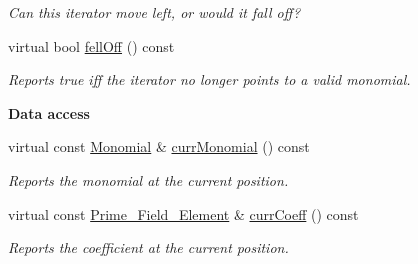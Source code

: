 \begin{Indent}
\begin{DoxyCompactItemize}
\begin{DoxyCompactList}\small\item\em Can this iterator move left, or would it fall off? \end{DoxyCompactList}\item 
virtual bool \hyperlink{class_geobucket___iterator_a5845016f7b9cb2c7538cef310af0b102}{fell\+Off} () const
\begin{DoxyCompactList}\small\item\em Reports true iff the iterator no longer points to a valid monomial. \end{DoxyCompactList}\end{DoxyCompactItemize}
\end{Indent}
\begin{Indent}\textbf{ Data access}\par
\begin{DoxyCompactItemize}
\item 
\mbox{\label{class_geobucket___iterator_ae885964ae542a38776b001df362da429}} 
virtual const \hyperlink{class_monomial}{Monomial} \& \hyperlink{class_geobucket___iterator_ae885964ae542a38776b001df362da429}{curr\+Monomial} () const
\begin{DoxyCompactList}\small\item\em Reports the monomial at the current position. \end{DoxyCompactList}\item 
\mbox{\label{class_geobucket___iterator_acba414051c5cc043d4d7eea3be5f051c}} 
virtual const \hyperlink{class_prime___field___element}{Prime\+\_\+\+Field\+\_\+\+Element} \& \hyperlink{class_geobucket___iterator_acba414051c5cc043d4d7eea3be5f051c}{curr\+Coeff} () const
\begin{DoxyCompactList}\small\item\em Reports the coefficient at the current position. \end{DoxyCompactList}\end{DoxyCompactItemize}
\end{Indent}
